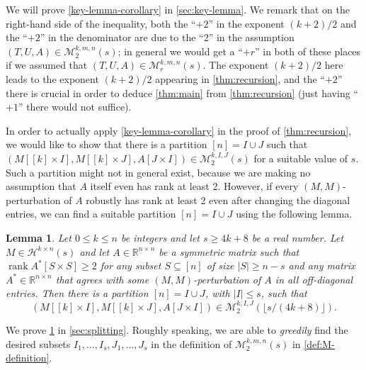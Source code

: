\documentclass[english]{article}
\newtheorem{lemma}[theorem]{Lemma}
\theoremstyle{remark}
\numberwithin{equation}{section}
\numberwithin{figure}{section}
\newcommand{\RR}{\mathbb{R}}
\newcommand{\on}{\operatorname}
\begin{document}
We will prove \cref{key-lemma-corollary} in \cref{sec:key-lemma}. We remark that on the right-hand side of the inequality, both the ``$+2$'' in
the exponent $(k+2)/2$ and the ``$+2$'' in the denominator are due to the ``2'' in the assumption $(T,U,A)\in\mathcal{M}_2^{k,m,n}(s)$;
in general we would get a ``$+r$'' in both of these places if we assumed
that $(T,U,A)\in\mathcal{M}_r^{k,m,n}(s)$. The exponent $(k+2)/2$ here leads to the exponent $(k+2)/2$ appearing in \cref{thm:recursion}, and the ``$+2$'' there is crucial in order to deduce \cref{thm:main} from \cref{thm:recursion} (just having ``$+1$'' there would not suffice).

In order to actually apply \cref{key-lemma-corollary} in the proof of \cref{thm:recursion}, we would like to show
that there is a partition $[n]=I \cup J$ such that $(M[[k]\times I],M[[k]\times J],A[J\times I])\in\mathcal{M}_2^{k,I,J}(s)$ for a suitable value of $s$.
Such a partition might not in general exist, because we are making no assumption that $A$ itself even has rank at least 2. However, if every $(M,M)$-perturbation of $A$ robustly has rank at least 2 even after changing the diagonal entries, we can find a suitable partition $[n]=I \cup J$ using the following lemma.



\begin{lemma}\label{lem:matrix-splitting}
Let $0\le k\le n$ be integers and let $s\ge 4k+8$ be a real number. Let $M\in\mathcal{H}^{k\times n}(s)$ and let $A\in \RR^{n\times n}$ be a symmetric matrix such that $\on{rank} A^*[S\times S]\ge 2$ for any subset $S\subseteq [n]$ of size $|S|\ge n- s$ and any matrix $A^*\in \RR^{n\times n}$ that agrees with some $(M,M)$-perturbation of $A$ in all off-diagonal entries. Then there is a partition $[n]= I\cup J$, with $|I|\le s$, such that
\[(M[[k]\times I],M[[k]\times J],A[J\times I])\in\mathcal{M}_2^{k,I,J}(\lfloor s/(4k+8)\rfloor).\]
\end{lemma}

We prove \cref{lem:matrix-splitting} in \cref{sec:splitting}. Roughly speaking, we are able to \emph{greedily} find the desired subsets $I_1,\dots,I_s,J_1,\dots,J_s$ in the definition of $\mathcal{M}_2^{k,m,n}(s)$ in \cref{def:M-definition}.
\end{document}
